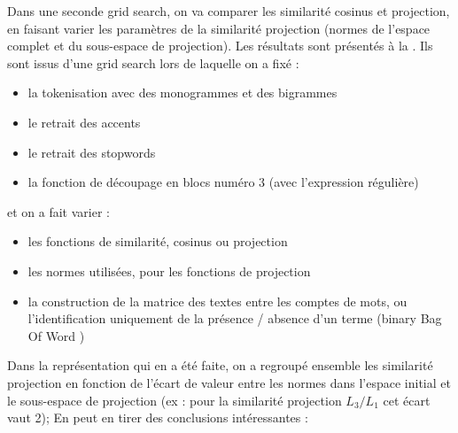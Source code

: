            Dans une seconde grid search, on va comparer les similarité cosinus et projection, en faisant varier les paramètres de la similarité projection (normes de l'espace complet et du sous-espace de projection).
            Les résultats sont présentés à la .
            Ils sont issus d'une grid search lors de laquelle on a fixé : 
            \begin{itemize}
                \item la tokenisation avec des monogrammes et des bigrammes
                \item le retrait des accents
                \item le retrait des stopwords
                \item la fonction de découpage en blocs numéro 3 (avec l'expression régulière)
            \end{itemize}
            et on a fait varier : 
            \begin{itemize}
                \item les fonctions de similarité, cosinus ou projection
                \item les normes utilisées, pour les fonctions de projection
                \item la construction de la matrice des textes entre les comptes de mots, ou l'identification uniquement de la présence / absence d'un terme (\og binary Bag Of Word \fg)
            \end{itemize}
            Dans la représentation qui en a été faite, on a regroupé ensemble les similarité projection en fonction de l'écart de valeur entre les normes dans l'espace initial et le sous-espace de projection (ex : pour la similarité projection $L_{3}/L_{1}$ cet écart vaut 2);
            En peut en tirer des conclusions intéressantes : 
